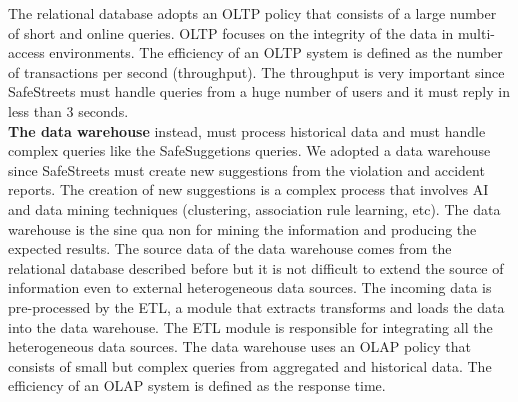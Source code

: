 \documentclass[./main.tex]{subfiles}
\begin{document}
The relational database adopts an OLTP policy that consists of a large number of short and online queries.  OLTP focuses on the integrity of the data in multi-access environments. The efficiency of an OLTP system is defined as the number of transactions per second (throughput). The throughput is very important since SafeStreets must handle queries from a huge number of users and it must reply in less than 3 seconds.
\medskip\\
\textbf{The data warehouse} instead, must process historical data and must handle complex queries like the SafeSuggetions queries. We adopted a data warehouse since SafeStreets must create new suggestions from the violation and accident reports. The creation of new suggestions is a complex process that involves AI and data mining techniques (clustering, association rule learning, etc). The data warehouse is the sine qua non for mining the information and producing the expected results. The source data of the data warehouse comes from the relational database described before but it is not difficult to extend the source of information even to external heterogeneous data sources. The incoming data is pre-processed by the ETL, a module that extracts transforms and loads the data into the data warehouse. The ETL module is responsible for integrating all the heterogeneous data sources. The data warehouse uses an OLAP policy that consists of small but complex queries from aggregated and historical data. The efficiency of an OLAP system is defined as the response time.
\end{document}
